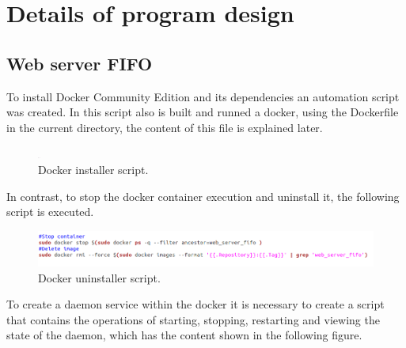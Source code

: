 \documentclass{article}
\begin{document}
\section{Details of program design}
\subsection{Web server FIFO}
To install Docker Community Edition and its dependencies an automation script was created. In this script also is built and runned a docker, using the Dockerfile in the current directory, the content of this file is explained later.

\begin{figure}[H]
	\centering
	\captionsetup{justification=centering, margin=1cm}
    \includegraphics[width = 0.01\textwidth]{installdocker.jpeg}
    \caption{Docker installer script.}
	\label{fig:installdocker}
\end{figure}

In contrast, to stop the docker container execution and uninstall it, the following script is executed.

\begin{figure}[H]
	\centering
	\captionsetup{justification=centering, margin=1cm}
    \includegraphics[width = \columnwidth]{removedocker.png}
    \caption{Docker uninstaller script.}
	\label{fig:removedocker}
\end{figure}

To create a daemon service within the docker it is necessary to create a script that contains the operations of starting, stopping, restarting and viewing the state of the daemon, which has the content shown in the following figure.
\end{document}
